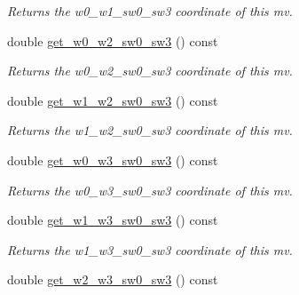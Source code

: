 \begin{DoxyCompactItemize}
\begin{DoxyCompactList}\small\item\em Returns the w0\-\_\-w1\-\_\-sw0\-\_\-sw3 coordinate of this mv. \end{DoxyCompactList}\item 
\hypertarget{classe3ga_1_1mv_af3bf3c5b5209d2562d006c2f68b564e1}{double \hyperlink{classe3ga_1_1mv_af3bf3c5b5209d2562d006c2f68b564e1}{get\-\_\-w0\-\_\-w2\-\_\-sw0\-\_\-sw3} () const }\label{classe3ga_1_1mv_af3bf3c5b5209d2562d006c2f68b564e1}

\begin{DoxyCompactList}\small\item\em Returns the w0\-\_\-w2\-\_\-sw0\-\_\-sw3 coordinate of this mv. \end{DoxyCompactList}\item 
\hypertarget{classe3ga_1_1mv_adf451c4c989e008155c7566d8867a4ec}{double \hyperlink{classe3ga_1_1mv_adf451c4c989e008155c7566d8867a4ec}{get\-\_\-w1\-\_\-w2\-\_\-sw0\-\_\-sw3} () const }\label{classe3ga_1_1mv_adf451c4c989e008155c7566d8867a4ec}

\begin{DoxyCompactList}\small\item\em Returns the w1\-\_\-w2\-\_\-sw0\-\_\-sw3 coordinate of this mv. \end{DoxyCompactList}\item 
\hypertarget{classe3ga_1_1mv_aef0c65f788ceade1c2ba4bdc562c9672}{double \hyperlink{classe3ga_1_1mv_aef0c65f788ceade1c2ba4bdc562c9672}{get\-\_\-w0\-\_\-w3\-\_\-sw0\-\_\-sw3} () const }\label{classe3ga_1_1mv_aef0c65f788ceade1c2ba4bdc562c9672}

\begin{DoxyCompactList}\small\item\em Returns the w0\-\_\-w3\-\_\-sw0\-\_\-sw3 coordinate of this mv. \end{DoxyCompactList}\item 
\hypertarget{classe3ga_1_1mv_a9068b19aedc79233ef69372afc87cb7e}{double \hyperlink{classe3ga_1_1mv_a9068b19aedc79233ef69372afc87cb7e}{get\-\_\-w1\-\_\-w3\-\_\-sw0\-\_\-sw3} () const }\label{classe3ga_1_1mv_a9068b19aedc79233ef69372afc87cb7e}

\begin{DoxyCompactList}\small\item\em Returns the w1\-\_\-w3\-\_\-sw0\-\_\-sw3 coordinate of this mv. \end{DoxyCompactList}\item 
\hypertarget{classe3ga_1_1mv_a7ba0935e6a5d034a852255571ba4d266}{double \hyperlink{classe3ga_1_1mv_a7ba0935e6a5d034a852255571ba4d266}{get\-\_\-w2\-\_\-w3\-\_\-sw0\-\_\-sw3} () const }\label{classe3ga_1_1mv_a7ba0935e6a5d034a852255571ba4d266}


\end{DoxyCompactItemize}

